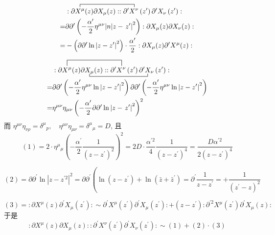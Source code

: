 \begin{remark}
$$
\begin{aligned}
&\contraction{: \partial}{X^{\mu}}{(z) \partial X_{\mu}(z):: \partial^{\prime}}{X^{\nu}}
: \partial  X^{\mu}(z) \partial X_{\mu}(z):: \partial^{\prime} X^{\nu} \left(z^{\prime}\right) \partial^{\prime} X_{\nu}\left(z^{\prime}\right):\\ =&\partial \partial^{\prime}\left(-\frac{\alpha^{\prime}}{2} \eta^{\mu \nu}|n| z-\left.z^{\prime}\right|^{2}\right): \partial X_{\mu}(z) \partial X_{\nu}(z):\\
=&-\left(\partial \partial^{\prime} \ln \left|z-z^{\prime}\right|^{2}\right) \cdot \frac{\alpha^{\prime}}{2}: \partial X_{\mu}(z) \partial^{\prime} X^{\mu}(z):
\end{aligned}
$$

$$
\begin{aligned}
&\contraction[2ex]{: \partial}{X^{\mu}}{(z) \partial X_{\mu}(z):: \partial^{\prime}}{X^{\nu}}
\bcontraction{: \partial X^\mu(z) \partial}{ X_\mu}{(z):: \partial^\prime X^\nu(z^\prime)\partial^\prime}{X_\nu}
	: \partial X^{\mu}(z) \partial X_{\mu}(z):: \partial^{\prime} X^{\nu}\left(z^{\prime}\right) \partial^{\prime} X_{\nu}\left(z^{\prime}\right):\\
=&\partial \partial^{\prime}\left(-\frac{\alpha^{\prime}}{2} \eta ^{\mu \nu} \ln \left|z-z^{\prime}\right|^{2}\right) \partial \partial^{\prime}\left(-\frac{\alpha^{\prime}}{2} \eta^{\mu \nu}\ln \left|z-z^{\prime}\right|^{2}\right) \\
=&\eta^{\mu \nu} \eta_{\mu \nu}\left(-\frac{\alpha^{\prime}}{2} \partial \partial^{\prime}\ln | z-\left.z^{\prime}\right|^{2}\right)^{2}
\end{aligned}
$$
而
$\eta^{\mu \nu} \eta_{\nu\rho}=\delta^{\mu}{ }_{p}, \quad \eta^{\mu \nu} \eta_{\mu \nu}=\delta^{\mu}{ }_{\mu}=D$,
且
$$
(1)=2 \cdot \eta^{\mu}{ }_{\mu}\left(-\frac{\alpha^{\prime}}{2} \frac{1}{\left(z-z^{\prime}\right)^{2}}\right)^{2}=2 D \cdot \frac{\alpha^{\prime 2}}{4} \frac{1}{\left(z-z^{\prime}\right)^{4}}=\frac{D \alpha^{\prime 2}}{2\left(z-z^{\prime}\right)^{4}}
$$

$$
(2)=\partial \partial^{\prime} \ln \left|z-z^{\prime 2}\right|^{2}=\partial \partial^{\prime}\left(\ln \left(z-z^{\prime}\right)+\ln \left(\bar{z}+\bar{z}^{\prime}\right)=\partial^{\prime} \frac{1}{z-z^{\prime}}=+\frac{1}{\left(z^{\prime}-z\right)^{2}}\right.
$$

$$
(3)=:\partial X^\mu(z)\partial^\prime X_{\mu}(z^\prime):\sim \partial^\prime X^\mu(z^\prime)\partial^\prime X_\mu(z^\prime): +(z-z^\prime):\partial^{\prime 2} X^\mu(z^\prime)\partial^\prime X_\mu(z):
$$
于是
$$
: \partial X^{\mu}(z) \partial X_{\mu}(z):: \partial^{\prime} X^{\nu}\left(z^{\prime}\right) \partial^{\prime} X_{\nu}\left(z^{\prime}\right):  \sim (1)+(2)\cdot(3)
$$
\end{remark}
